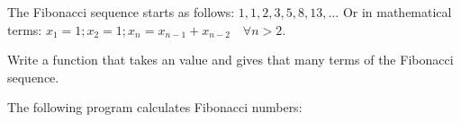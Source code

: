 \begin{Exercise}[title={Fibonacci},difficulty=1]
\label{ex:fibonaci}
\Question\label{ex:fibonaci q1}
The Fibonacci sequence starts as follows: $1, 1, 2, 3, 5, 8, 13, \ldots$
Or in mathematical terms: $ x_1 = 1; x_2 = 1; x_n = x_{n-1} +
x_{n-2}\quad\forall n > 2 $.

Write a function that takes an  value and gives 
that many terms of the Fibonacci sequence.

\end{Exercise}

\begin{Answer}
\Question
The following program calculates Fibonacci numbers:


\showremarks
\end{Answer}
